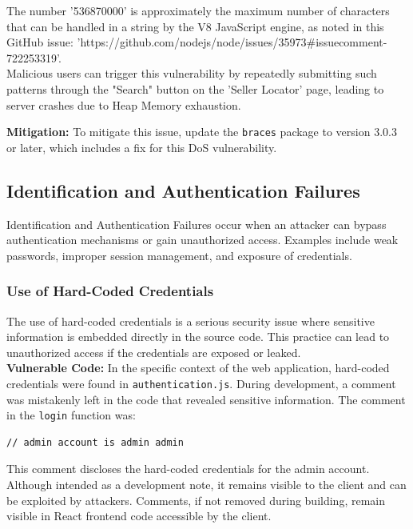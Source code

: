 \documentclass[]{article}
\begin{document}
The number '536870000' is approximately the maximum number of characters that can be handled in a string by the V8 JavaScript engine, as noted in this GitHub issue: \footnotesize 'https://github.com/nodejs/node/issues/35973\#issuecomment-722253319'.\\
\normalsize
Malicious users can trigger this vulnerability by repeatedly submitting such patterns through the "Search" button on the 'Seller Locator' page, leading to server crashes due to Heap Memory exhaustion.

\textbf{Mitigation:}
To mitigate this issue, update the \texttt{braces} package to version 3.0.3 or later, which includes a fix for this DoS vulnerability.

\subsection{Identification and Authentication Failures}

Identification and Authentication Failures occur when an attacker can bypass authentication mechanisms or gain unauthorized access. Examples include weak passwords, improper session management, and exposure of credentials.

\subsubsection{Use of Hard-Coded Credentials}

The use of hard-coded credentials is a serious security issue where sensitive information is embedded directly in the source code. This practice can lead to unauthorized access if the credentials are exposed or leaked. \\

\textbf{Vulnerable Code:}
In the specific context of the web application, hard-coded credentials were found in \texttt{authentication.js}. During development, a comment was mistakenly left in the code that revealed sensitive information. The comment in the \texttt{login} function was:

\begin{lstlisting}
// admin account is admin admin
\end{lstlisting}

This comment discloses the hard-coded credentials for the admin account. Although intended as a development note, it remains visible to the client and can be exploited by attackers. Comments, if not removed during building, remain visible in React frontend code accessible by the client.
\end{document}
